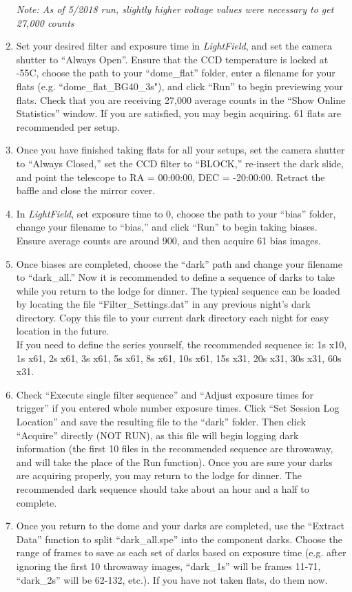 \documentclass[12pt]{article}
\begin{document}
\begin{enumerate}
\begin{itemize}
   \end{itemize}
   \textit{Note: As of 5/2018 run, slightly higher voltage values were necessary to get 27,000 counts}
   \item Set your desired filter and exposure time in \textit{LightField}, and set the camera shutter to ``Always Open''. Ensure that the CCD temperature is locked at -55\textdegree C, choose the path to your ``dome\_flat'' folder, enter a filename for your flats (e.g. ``dome\_flat\_BG40\_3s"), and click ``Run'' to begin previewing your flats. Check that you are receiving 27,000 average counts in the ``Show Online Statistics'' window. If you are satisfied, you may  begin acquiring. 61 flats are recommended per setup.
   \item Once you have finished taking flats for all your setups, set the camera shutter to ``Always Closed,'' set the CCD filter to ``BLOCK,'' re-insert the dark slide, and point the telescope to RA = 00:00:00, DEC = -20:00:00. Retract the baffle and close the mirror cover.
   \item In \textit{LightField}, set exposure time to 0, choose the path to your ``bias'' folder, change your filename to ``bias,'' and click ``Run'' to begin taking biases. Ensure average counts are around 900, and then acquire 61 bias images.
   \item Once biases are completed, choose the ``dark'' path and change your filename to ``dark\_all.'' Now it is recommended to define a sequence of darks to take while you return to the lodge for dinner. The typical sequence can be loaded by locating the file ``Filter\_Settings.dat'' in any previous night's dark directory. Copy this file to your current dark directory each night for easy location in the future.\\
   If you need to define the series yourself, the recommended sequence is: 1s x10, 1s x61, 2s x61, 3s x61, 5s x61, 8s x61, 10s x61, 15s x31, 20s x31, 30s x31, 60s x31.
   \item Check ``Execute single filter sequence'' and ``Adjust exposure times for trigger'' if you entered whole number exposure times. Click ``Set Session Log Location'' and save the resulting file to the ``dark'' folder. Then click ``Acquire'' directly (NOT RUN), as this file will begin logging dark information (the first 10 files in the recommended sequence are throwaway, and will take the place of the Run function). Once you are sure your darks are acquiring properly, you may return to the lodge for dinner. The recommended dark sequence should take about an hour and a half to complete.
   \item Once you return to the dome and your darks are completed, use the ``Extract Data'' function to split ``dark\_all.spe'' into the component darks. Choose the range of frames to save as each set of darks based on exposure time (e.g. after ignoring the first 10 throwaway images, ``dark\_1s'' will be frames 11-71, ``dark\_2s'' will be 62-132, etc.). If you have not taken flats, do them now.
\end{enumerate}
\end{document}
